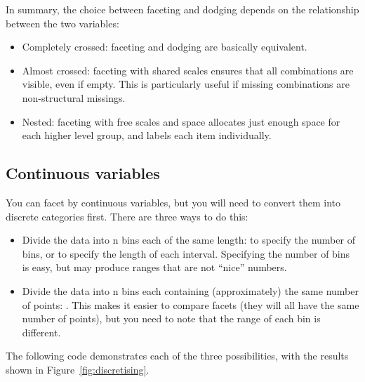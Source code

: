 In summary, the choice between faceting and dodging depends on the relationship between the two variables:

\begin{itemize}
  \item Completely crossed: faceting and dodging are basically equivalent.

  \item Almost crossed: faceting with shared scales ensures that all combinations are visible, even if empty. This is particularly useful if missing combinations are non-structural missings.

  \item Nested: faceting with free scales and space allocates just enough space for each higher level group, and labels each item individually.
\end{itemize}

\subsection{Continuous variables}\label{sub:continuous_variables}

You can facet by continuous variables, but you will need to convert them into discrete categories first. There are three ways to do this:

\begin{itemize}
  \item Divide the data into n bins each of the same length:  to specify the number of bins, or  to specify the length of each interval.  Specifying the number of bins is easy, but may produce ranges that are not ``nice'' numbers.
  
  \item Divide the data into n bins each containing (approximately) the same number of points: .  This makes it easier to compare facets (they will all have the same number of points), but you need to note that the range of each bin is different.
    
\end{itemize}

\noindent The following code demonstrates each of the three possibilities, with the results shown in Figure~\ref{fig:discretising}.

% 
%


